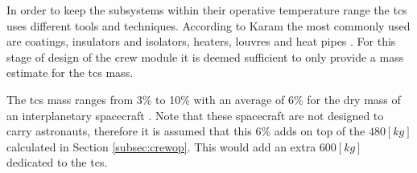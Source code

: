 In order to keep the subsystems within their operative temperature range the \gls{tcs} uses different tools and techniques. According to Karam the most commonly used are coatings, insulators and isolators, heaters, louvres and heat pipes \cite{Karam1998}. For this stage of design of the crew module it is deemed sufficient to only provide a mass estimate for the \gls{tcs} mass.

The \gls{tcs} mass ranges from 3\% to 10\% with an average of 6\% for the dry mass of an interplanetary spacecraft \cite[p.953]{Wertz2011}. Note that these spacecraft are not designed to carry astronauts, therefore it is assumed that this 6\% adds on top of the $480 \left[kg\right]$ calculated in Section \ref{subsec:crewop}. This would add an extra $600 \left[kg\right]$ dedicated to the \gls{tcs}.
